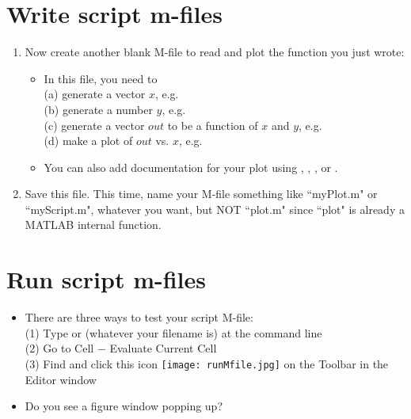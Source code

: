\documentclass[12pt]{article}
\begin{document}
\section{Write script m-files}
\begin{enumerate}
\item Now create another blank M-file to read and plot the function you just wrote:
\begin{itemize}
\item In this file, you need to \\
(a) generate a vector $x$, e.g.  \\
(b) generate a number $y$, e.g. \\
(c) generate a vector $out$ to be a function of $x$ and $y$, e.g. \\
(d) make a plot of $out$ vs. $x$, e.g. 
\item You can also add documentation for your plot using , , , or .
\end{itemize}
\item Save this file. This time, name your M-file something like ``myPlot.m" or ``myScript.m", whatever you want, but NOT ``plot.m" since ``plot" is already a MATLAB internal function.

\end{enumerate}

\section{Run script m-files}
\begin{itemize}
\item There are three ways to test your script M-file:\\
(1) Type  or  (whatever your filename is) at the command line\\
(2) Go to Cell $-$ Evaluate Current Cell\\
(3) Find and click this icon \texttt{[image: runMfile.jpg]} on the Toolbar in the Editor window
\item Do you see a figure window popping up?
\end{itemize}

\end{document}
